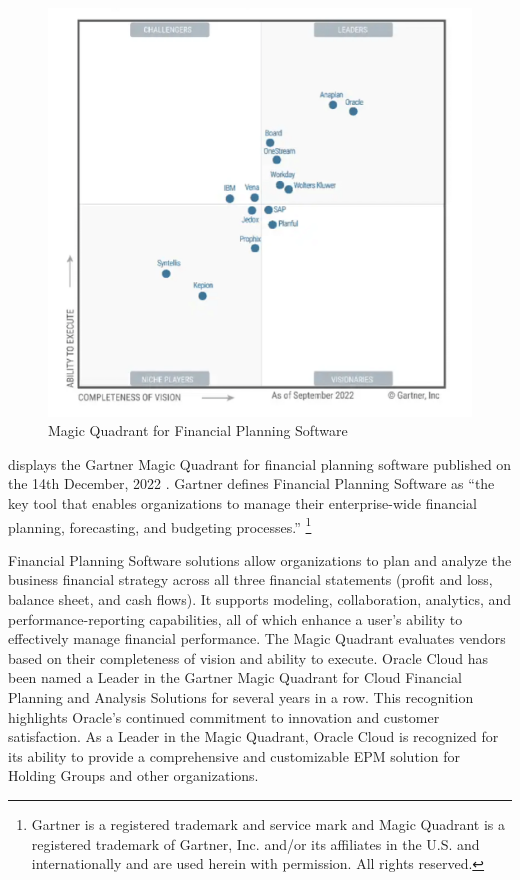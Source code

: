 \documentclass[12pt,a4paper,openright,twoside]{book}
\begin{document}
\begin{figure}[htbp]
	\centering
	\includegraphics[width=\linewidth]{figures/gartner.pdf}
	\caption{Magic Quadrant for Financial Planning Software}
	\label{fig:gartner}
\end{figure}

 displays the Gartner Magic Quadrant for financial planning software published on the 14th December, 2022 \cite{gartner2022magic}.
%
Gartner defines Financial Planning Software as ``the key tool that enables organizations to manage their enterprise-wide financial planning, forecasting, and budgeting processes.'' \footnote{Gartner is a registered trademark and service mark and Magic Quadrant is a registered trademark of Gartner, Inc. and/or its affiliates in the U.S. and internationally and are used herein with permission. All rights reserved.}

Financial Planning Software solutions allow organizations to plan and analyze the business financial strategy across all three financial statements (profit and loss, balance sheet, and cash flows). 
%
It supports modeling, collaboration, analytics, and performance-reporting capabilities, all of which enhance a user’s ability to effectively manage financial performance.
%
The Magic Quadrant evaluates vendors based on their completeness of vision and ability to execute. 
%
Oracle Cloud has been named a Leader in the Gartner Magic Quadrant for Cloud Financial Planning and Analysis Solutions for several years in a row. 
%
This recognition highlights Oracle's continued commitment to innovation and customer satisfaction. 
%
As a Leader in the Magic Quadrant, Oracle Cloud is recognized for its ability to provide a comprehensive and customizable EPM solution for Holding Groups and other organizations.
\end{document}
